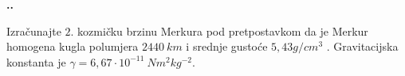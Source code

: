 

\noindent 
\textbf{
\thecjelina.\thezadatak.}

Izračunajte $2.$ kozmičku brzinu Merkura pod pretpostavkom da je Merkur homogena kugla polumjera $2440\ km$ i srednje gustoće $5,43 g/cm^3$ . Gravitacijska konstanta je $\gamma = 6,67\cdot  10^{-11}\ Nm^2kg^{-2}$.%


